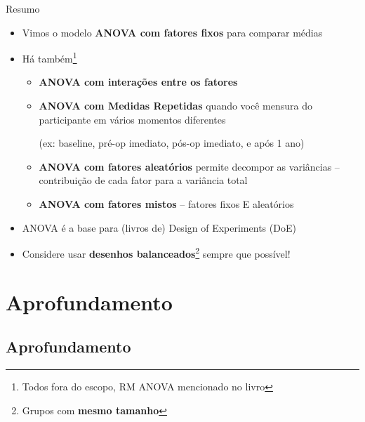 \documentclass{beamer}
\begin{document}
\begin{frame}{Resumo}
  \begin{itemize}
    \footnotesize
  \item Vimos o modelo {\bf ANOVA com fatores fixos} para comparar médias
    \bigskip
  \item Há também\footnote{\scriptsize Todos fora do escopo, RM ANOVA mencionado no livro}
    \begin{itemize}
      \scriptsize
    \item {\bf ANOVA com interações entre os fatores}
    \item {\bf ANOVA com Medidas Repetidas} quando você mensura do participante em vários momentos diferentes

      (ex: baseline, pré-op imediato, pós-op imediato, e após 1 ano)
    \item {\bf ANOVA com fatores aleatórios} permite decompor as variâncias -- contribuição de cada fator para a variância total
    \item {\bf ANOVA com fatores mistos} -- fatores fixos E aleatórios
    \end{itemize}
    \bigskip
  \item ANOVA é a base para (livros de) Design of Experiments (DoE)
    \bigskip
  \item Considere usar {\bf desenhos balanceados}\footnote{Grupos com {\bf mesmo tamanho}} sempre que possível!
  \end{itemize}
\end{frame}



\section{Aprofundamento}

\subsection{Aprofundamento}
\end{document}
